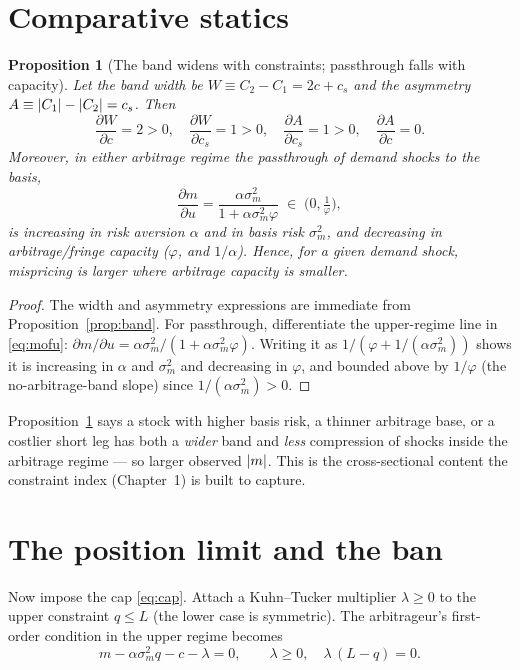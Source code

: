\documentclass[11pt,a4paper]{article}
\DeclarePairedDelimiter{\abs}{\lvert}{\rvert}
\theoremstyle{plain}
\newtheorem{proposition}{Proposition}
\theoremstyle{definition}
\theoremstyle{remark}
\begin{document}
\section{Comparative statics}\label{sec:cs}
\begin{proposition}[The band widens with constraints; passthrough falls with capacity]\label{prop:cs}
Let the band width be $W\equiv C_2-C_1 = 2c+c_s$ and the asymmetry $A\equiv\abs{C_1}-\abs{C_2}=c_s$. Then
\begin{equation}
\frac{\partial W}{\partial c}=2>0,\quad \frac{\partial W}{\partial c_s}=1>0,\quad \frac{\partial A}{\partial c_s}=1>0,\quad \frac{\partial A}{\partial c}=0.
\end{equation}
Moreover, in either arbitrage regime the passthrough of demand shocks to the basis,
\begin{equation}
\frac{\partial m}{\partial u} = \frac{\alpha\sigma_m^2}{1+\alpha\sigma_m^2\varphi}\;\in\;\Big(0,\tfrac1\varphi\Big),
\end{equation}
is increasing in risk aversion $\alpha$ and in basis risk $\sigma_m^2$, and decreasing in arbitrage/fringe capacity ($\varphi$, and $1/\alpha$). Hence, for a given demand shock, mispricing is larger where arbitrage capacity is smaller.
\end{proposition}
\begin{proof}
The width and asymmetry expressions are immediate from Proposition~\ref{prop:band}. For passthrough, differentiate the upper-regime line in \eqref{eq:mofu}: $\partial m/\partial u=\alpha\sigma_m^2/(1+\alpha\sigma_m^2\varphi)$. Writing it as $1/(\varphi+1/(\alpha\sigma_m^2))$ shows it is increasing in $\alpha$ and $\sigma_m^2$ and decreasing in $\varphi$, and bounded above by $1/\varphi$ (the no-arbitrage-band slope) since $1/(\alpha\sigma_m^2)>0$.
\end{proof}

Proposition~\ref{prop:cs} says a stock with higher basis risk, a thinner arbitrage base, or a costlier short leg has both a \emph{wider} band and \emph{less} compression of shocks inside the arbitrage regime --- so larger observed $\abs{m}$. This is the cross-sectional content the constraint index (Chapter~1) is built to capture.

\section{The position limit and the ban}\label{sec:ban}
Now impose the cap \eqref{eq:cap}. Attach a Kuhn--Tucker multiplier $\lambda\ge 0$ to the upper constraint $q\le L$ (the lower case is symmetric). The arbitrageur's first-order condition in the upper regime becomes
\begin{equation}
m - \alpha\sigma_m^2 q - c - \lambda = 0, \qquad \lambda\ge 0,\quad \lambda\,(L-q)=0. \label{eq:kkt}
\end{equation}
\end{document}
